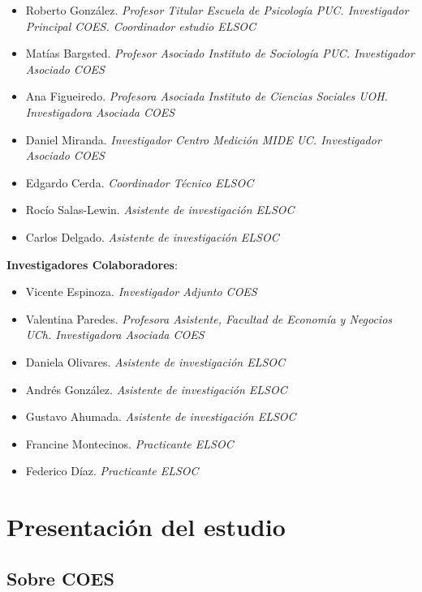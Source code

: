 \documentclass[
  12pt,
]{book}
\providecommand{\tightlist}{%
  \setlength{\itemsep}{0pt}\setlength{\parskip}{0pt}}
\begin{document}
\begin{itemize}
\tightlist
\item
  Roberto González. \emph{Profesor Titular Escuela de Psicología PUC. Investigador Principal COES. Coordinador estudio ELSOC}
\item
  Matías Bargsted. \emph{Profesor Asociado Instituto de Sociología PUC. Investigador Asociado COES}
\item
  Ana Figueiredo. \emph{Profesora Asociada Instituto de Ciencias Sociales UOH. Investigadora Asociada COES}
\item
  Daniel Miranda. \emph{Investigador Centro Medición MIDE UC. Investigador Asociado COES}
\item
  Edgardo Cerda. \emph{Coordinador Técnico ELSOC}
\item
  Rocío Salas-Lewin. \emph{Asistente de investigación ELSOC}
\item
  Carlos Delgado. \emph{Asistente de investigación ELSOC}
\end{itemize}

\textbf{Investigadores Colaboradores}:

\begin{itemize}
\tightlist
\item
  Vicente Espinoza. \emph{Investigador Adjunto COES}
\item
  Valentina Paredes. \emph{Profesora Asistente, Facultad de Economía y Negocios UCh. Investigadora Asociada COES}
\item
  Daniela Olivares. \emph{Asistente de investigación ELSOC}
\item
  Andrés González. \emph{Asistente de investigación ELSOC}
\item
  Gustavo Ahumada. \emph{Asistente de investigación ELSOC}
\item
  Francine Montecinos. \emph{Practicante ELSOC}
\item
  Federico Díaz. \emph{Practicante ELSOC}
\end{itemize}

\hypertarget{presentaciuxf3n-del-estudio}{%
\chapter{Presentación del estudio}\label{presentaciuxf3n-del-estudio}}

\hypertarget{sobre-coes}{%
\section{Sobre COES}\label{sobre-coes}}
\end{document}
